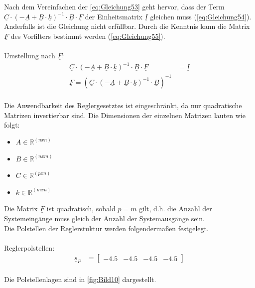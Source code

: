 \documentclass[
	pagesize,
	fontsize=12pt,
	paper=a4,
	oneside,
   reqno
]{scrartcl}
\begin{document}
Nach dem Vereinfachen der \autoref{eq:Gleichung53} geht hervor, dass der Term $\underline{C}\cdot(-\underline{A}+\underline{B}\cdot{\underline{k}})^{-1}\cdot\underline{B}\cdot\underline{F}$ der Einheitsmatrix $\underline{I}$ gleichen muss (\autoref{eq:Gleichung54}). Anderfalls ist die Gleichung nicht erfüllbar. Durch die Kenntnis kann die Matrix $\underline{F}$ des Vorfilters bestimmt werden (\autoref{eq:Gleichung55}).\\\\
Umstellung nach $\underline{F}$:
\begin{align}
    \underline{C}\cdot(-\underline{A}+\underline{B}\cdot{\underline{k}})^{-1}\cdot\underline{B}\cdot\underline{F} &= \underline{I} \label{eq:Gleichung54}\\
    \underline{F} = (\underline{C}\cdot(-\underline{A}+\underline{B}\cdot{\underline{k}})^{-1}\cdot\underline{B})^{-1} \label{eq:Gleichung55}
\end{align}\\
Die Anwendbarkeit des Reglergesetztes ist eingeschränkt, da nur quadratische Matrizen invertierbar sind. Die Dimensionen der einzelnen Matrizen lauten wie folgt:
\begin{itemize}
    \item $A\in\mathbb{R}^{(nxn)}$
    \item $B\in\mathbb{R}^{(nxm)}$
    \item $C\in\mathbb{R}^{(pxn)}$
    \item $k\in\mathbb{R}^{(mxn)}$
\end{itemize}
Die Matrix $\underline{F}$ ist quadratisch, sobald $p = m$ gilt, d.h. die Anzahl der Systemeingänge muss gleich der Anzahl der Systemausgänge sein.\\
Die Polstellen der Reglerstuktur werden folgendermaßen festgelegt.\\\\
Reglerpolstellen:
\begin{align}\label{eq:Gleichung56}
    \underline{s}_{P} &=
    \begin{bmatrix}
        -4.5 & -4.5 & -4.5 & -4.5
    \end{bmatrix}
\end{align}\\
Die Polstellenlagen sind in \autoref{fig:Bild10} dargestellt.
\end{document}
